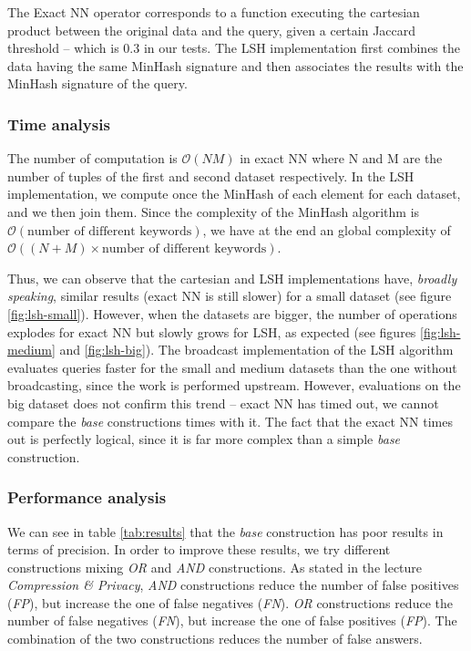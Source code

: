 \documentclass[a4paper,10pt]{IEEEtran}
\begin{document}
The Exact NN operator corresponds to a function executing the cartesian product between the original data and the query, given a certain Jaccard threshold -- which is 0.3 in our tests.
The LSH implementation first combines the data having the same MinHash signature and then associates the results with the MinHash signature of the query.

\subsubsection{Time analysis}

The number of computation is $\mathcal{O}(N M)$ in exact NN where N and M are the number of tuples of the first and second dataset respectively.
In the LSH implementation, we compute once the MinHash of each element for each dataset, and we then join them.
Since the complexity of the MinHash algorithm is  $\mathcal{O}(\textrm{number of different keywords})$, we have at the end an global complexity of $\mathcal{O}((N+M) \times \textrm{number of different keywords})$.

Thus, we can observe that the cartesian and LSH implementations have, \textit{broadly speaking}, similar results (exact NN is still slower) for a small dataset (see figure \ref{fig:lsh-small}).
However, when the datasets are bigger, the number of operations explodes for exact NN but slowly grows for LSH, as expected (see figures \ref{fig:lsh-medium} and \ref{fig:lsh-big}).
The broadcast implementation of the LSH algorithm evaluates queries faster for the small and medium datasets than the one without broadcasting, since the work is performed upstream. 
However, evaluations on the big dataset does not confirm this trend -- exact NN has timed out, we cannot compare the \textit{base} constructions times with it.
The fact that the exact NN times out is perfectly logical, since it is far more complex than a simple \textit{base} construction.

\subsubsection{Performance analysis}

We can see in table \ref{tab:results} that the \textit{base} construction has poor results in terms of precision. 
In order to improve these results, we try different constructions mixing \textit{OR} and \textit{AND} constructions.
As stated in the lecture \textit{Compression \& Privacy}, \textit{AND} constructions reduce the number of false positives (\textit{FP}), but increase the one of false negatives (\textit{FN}).
\textit{OR} constructions reduce the number of false negatives (\textit{FN}), but increase the one of false positives (\textit{FP}).
The combination of the two constructions reduces the number of false answers.
\end{document}
